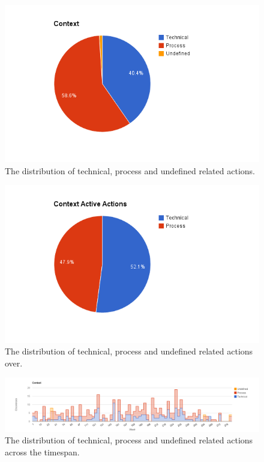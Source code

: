 \begin{figure}[!h]
	\centering
	\includegraphics[width=\textwidth, keepaspectratio]{figures/context-p.png}
	\caption{The distribution of technical, process and undefined related actions.}
	\label{figure:context-p}
\end{figure}

\begin{figure}[!h]
	\centering
	\includegraphics[width=\textwidth, keepaspectratio]{figures/context-pa.png}
	\caption{The distribution of technical, process and undefined related actions over.}
	\label{figure:context-pa}
\end{figure}

\begin{figure}
	\centering
	\includegraphics[width=\textwidth, keepaspectratio]{figures/context-l.png}
	\caption{The distribution of technical, process and undefined related actions across the timespan.}
	\label{figure:context-l}
\end{figure}

